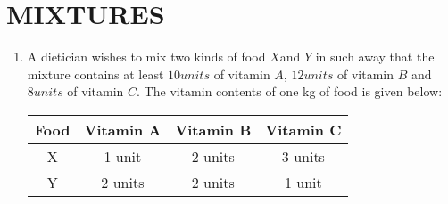 \documentclass[12pt]{article}
\begin{document}
						\section{MIXTURES}
						\begin{enumerate}
							\item A dietician wishes to mix two kinds of food $X $and $Y$ in such away that the mixture contains at least $10 units$ of vitamin $A$, $12 units$ of vitamin $B$ and $8 units$ of vitamin $C$. The vitamin contents of one kg of food is given below: 
								\begin{center}
								         \begin{tabular}{|c|c|c|c|} 
	         \hline
	        Food & Vitamin A & Vitamin B & Vitamin C \\ 
							         \hline
									 X & 1 unit & 2 units & 3 units \\
									 \hline
									 
									 Y & 2 units & 2 units & 1 unit \\ 
									
									 \hline
									 
									 \end{tabular}
									 
\end{center} 
						\end{enumerate}
\end{document}
